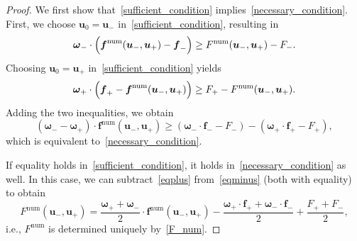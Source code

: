 \documentclass[]{scrartcl}
\renewcommand{\vec}[1]{\boldsymbol{#1}}
\theoremstyle{definition}
\begin{document}
\begin{proof}
We first show that~\eqref{sufficient_condition} implies~\eqref{necessary_condition}.
First, we choose  $\vec{u}_0 = \vec{u}_-$ in~\eqref{sufficient_condition}, resulting in
\begin{equation}
\vec{\omega}_- \cdot \Bigl (\vec{f}^{\mathrm{num}}(\vec{u}_-, \vec{u}_+) - \vec{f}_- \Bigr ) \geq F^{\mathrm{num}}(\vec{u}_-, \vec{u}_+) - F_-.
\label{eqminus}
\end{equation}
Choosing $\vec{u}_0 = \vec{u}_+$ in~\eqref{sufficient_condition} yields
\begin{equation}
\vec{\omega}_+ \cdot \Bigl (\vec{f}_+ - \vec{f}^{\mathrm{num}}(\vec{u}_-, \vec{u}_+) \Bigr ) \geq F_+ - F^{\mathrm{num}}(\vec{u}_-, \vec{u}_+).
\label{eqplus}
\end{equation}
Adding the two inequalities, we obtain
\begin{equation}
\left ( \vec{\omega}_- - \vec{\omega}_+ \right ) \cdot \vec{f}^{\mathrm{num}}(\vec{u}_-, \vec{u}_+) \geq \left (\vec{\omega}_- \cdot \vec{f}_- - F_- \right ) - \left (\vec{\omega}_+ \cdot \vec{f}_+ - F_+ \right ),
\end{equation}
which is equivalent to~\eqref{necessary_condition}.

If equality holds in~\eqref{sufficient_condition}, it holds in~\eqref{necessary_condition} as well.
In this case, we can subtract~\eqref{eqplus} from~\eqref{eqminus} (both with equality) to obtain
\begin{equation}
F^{\mathrm{num}}(\vec{u}_-, \vec{u}_+) = \frac{\vec{\omega}_+ + \vec{\omega}_-}{2} \cdot \vec{f}^{\mathrm{num}}(\vec{u}_-, \vec{u}_+) - \frac{\vec{\omega}_+ \cdot \vec{f}_+ + \vec{\omega}_- \cdot \vec{f}_-}{2} + \frac{F_+ + F_-}{2},
\end{equation}
i.e., $F^\mathrm{num}$ is determined uniquely by~\eqref{F_num}.


\end{proof}
\end{document}
